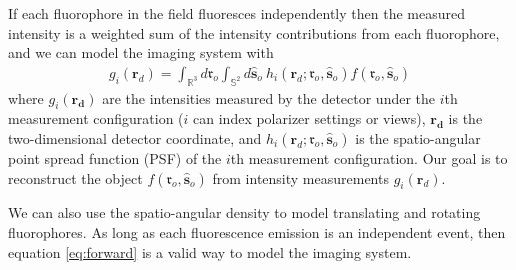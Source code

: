 \documentclass[11pt]{article}
\providecommand{\mb}[1]{\mathbf{#1}}
\providecommand{\ro}[1]{\mathbf{\mathfrak{r}}_o}
\providecommand{\so}[1]{\mathbf{\hat{s}}_o}
\providecommand{\rd}[1]{\mathbf{r}_d}
\begin{document}
If each fluorophore in the field fluoresces independently then the measured
intensity is a weighted sum of the intensity contributions from each
fluorophore, and we can model the imaging system with
\begin{align}
  g_i(\rd{}) = \int_{\mathbb{R}^3}d\ro{} \int_{\mathbb{S}^2}d\so{}\ h_i(\rd{}; \ro{}, \so{})f(\ro{}, \so{})\label{eq:forward}
\end{align}
where $g_i(\mb{r_d})$ are the intensities measured by the detector under the
$i$th measurement configuration ($i$ can index polarizer settings or views),
$\mb{r_d}$ is the two-dimensional detector coordinate, and
$h_i(\rd{}; \ro{}, \so{})$ is the spatio-angular point spread function (PSF) of
the $i$th measurement configuration. Our goal is to reconstruct the object
$f(\ro{}, \so{})$ from intensity measurements $g_i(\rd{})$.

We can also use the spatio-angular density to model translating and rotating
fluorophores. As long as each fluorescence emission is an independent event,
then equation \ref{eq:forward} is a valid way to model the imaging system.
\end{document}
